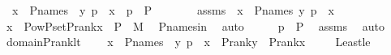 \begin{isabellebody}
\ \ {\isachardoublequoteopen}x\ {\isasymin}\ P{\isacharunderscore}{\kern0pt}names\ {\isasymLongrightarrow}\ {\isacharless}{\kern0pt}y{\isacharcomma}{\kern0pt}\ p{\isachargreater}{\kern0pt}\ {\isasymin}\ x\ {\isasymLongrightarrow}\ p\ {\isasymin}\ P{\isachardoublequoteclose}\ \isanewline
%
\isadelimproof
%
\endisadelimproof
%
\isatagproof
{}\isamarkupfalse%
\ {\isacharminus}{\kern0pt}\ \isanewline
\ \ \isamarkupfalse%
\ assms\ {\isacharcolon}{\kern0pt}\ {\isachardoublequoteopen}x\ {\isasymin}\ P{\isacharunderscore}{\kern0pt}names{\isachardoublequoteclose}\ {\isachardoublequoteopen}{\isacharless}{\kern0pt}y{\isacharcomma}{\kern0pt}\ p{\isachargreater}{\kern0pt}\ {\isasymin}\ x{\isachardoublequoteclose}\isanewline
\ \ \isamarkupfalse%
\ \isamarkupfalse%
\ {\isachardoublequoteopen}x\ {\isasymin}\ Pow{\isacharparenleft}{\kern0pt}P{\isacharunderscore}{\kern0pt}set{\isacharparenleft}{\kern0pt}P{\isacharunderscore}{\kern0pt}rank{\isacharparenleft}{\kern0pt}x{\isacharparenright}{\kern0pt}{\isacharparenright}{\kern0pt}\ {\isasymtimes}\ P{\isacharparenright}{\kern0pt}\ {\isasyminter}\ M{\isachardoublequoteclose}\ \isamarkupfalse%
\ P{\isacharunderscore}{\kern0pt}names{\isacharunderscore}{\kern0pt}in\ \isamarkupfalse%
\ auto\isanewline
\ \ \isamarkupfalse%
\ \isamarkupfalse%
\ {\isachardoublequoteopen}p\ {\isasymin}\ P{\isachardoublequoteclose}\ \isamarkupfalse%
\ assms\ \isamarkupfalse%
\ auto\isanewline
{}\isamarkupfalse%
%
\endisatagproof
{\isafoldproof}%
%
\isadelimproof
\isanewline
%
\endisadelimproof
\isanewline
{}\isamarkupfalse%
\ domain{\isacharunderscore}{\kern0pt}P{\isacharunderscore}{\kern0pt}rank{\isacharunderscore}{\kern0pt}lt\ {\isacharcolon}{\kern0pt}\ \isanewline
\ \ {\isachardoublequoteopen}x\ {\isasymin}\ P{\isacharunderscore}{\kern0pt}names\ {\isasymLongrightarrow}\ {\isacharless}{\kern0pt}y{\isacharcomma}{\kern0pt}\ p{\isachargreater}{\kern0pt}\ {\isasymin}\ x\ {\isasymLongrightarrow}\ P{\isacharunderscore}{\kern0pt}rank{\isacharparenleft}{\kern0pt}y{\isacharparenright}{\kern0pt}\ {\isacharless}{\kern0pt}\ P{\isacharunderscore}{\kern0pt}rank{\isacharparenleft}{\kern0pt}x{\isacharparenright}{\kern0pt}{\isachardoublequoteclose}\ \isanewline
\ \ \isamarkupfalse%
\ Least{\isacharunderscore}{\kern0pt}le\isanewline
%
\isadelimproof
%
\endisadelimproof
%
\isatagproof
{}\isamarkupfalse%
\ {\isacharminus}{\kern0pt}\ \isanewline

\end{isabellebody}
